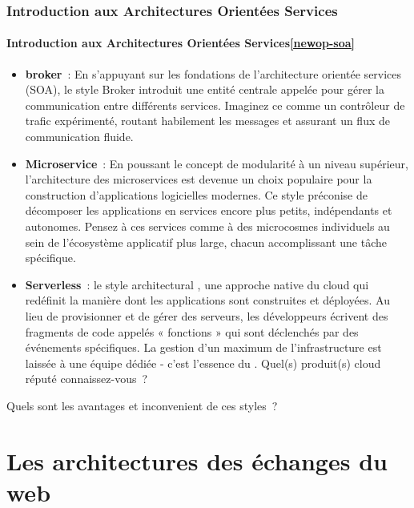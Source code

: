 \documentclass{beamer}
\begin{document}
    \begin{frame}
        \transdissolve
        \frametitle{Introduction aux Architectures Orientées Services}
        \framesubtitle{Introduction aux Architectures Orientées Services\cref{newop-soa}}
        \begin{footnotesize}
            \begin{itemize}
                \item \textbf{broker}~: En s'appuyant sur les fondations de l'architecture orientée services (SOA), le style Broker introduit une entité centrale appelée  pour gérer la communication entre différents services.
                Imaginez ce  comme un contrôleur de trafic expérimenté, routant habilement les messages et assurant un flux de communication fluide.
                \item \textbf{Microservice}~: En poussant le concept de modularité à un niveau supérieur, l'architecture des microservices est devenue un choix populaire pour la construction d'applications logicielles modernes.
                Ce style préconise de décomposer les applications en services encore plus petits, indépendants et autonomes.
                Pensez à ces services comme à des microcosmes individuels au sein de l'écosystème applicatif plus large, chacun accomplissant une tâche spécifique.
                \item \textbf{Serverless}~: le style architectural , une approche native du cloud qui redéfinit la manière dont les applications sont construites et déployées.
                Au lieu de provisionner et de gérer des serveurs, les développeurs écrivent des fragments de code appelés « fonctions » qui sont déclenchés par des événements spécifiques.
                La gestion d'un maximum de l'infrastructure est laissée à une équipe dédiée - c'est l'essence du .
                Quel(s) produit(s) cloud  réputé connaissez-vous~?
            \end{itemize}
            Quels sont les avantages et inconvenient de ces styles~?
        \end{footnotesize}
    \end{frame}


    \section{Les architectures des échanges du web}\label{sec:web-com}
\end{document}
